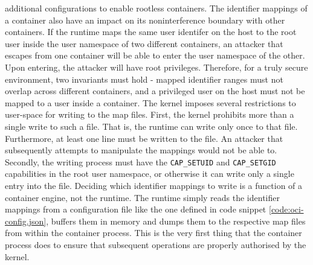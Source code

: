 additional configurations to enable rootless containers.
The identifier mappings of a container also have an impact on its noninterference boundary with 
other containers. If the runtime maps the same user identifer on the host to the root user inside the user namespace of two different containers, an 
attacker that escapes from one container will be able to enter the user namespace of the other. Upon entering,
the attacker will have root privileges. Therefore, for a truly secure environment, two invariants must hold - 
mapped identifier ranges must not overlap across different containers, and a privileged user on the host must 
not be mapped to a user inside a container. The kernel imposes several restrictions to user-space for 
writing to the map files. First, the kernel prohibits more than a single write to such a file. 
That is, the runtime can write only once to that file. Furthermore, at least one line must be 
written to the file. An attacker that subsequently attempts to manipulate the mappings would not 
be able to. Secondly, the writing process must have the \verb|CAP_SETUID| and 
\verb|CAP_SETGID| capabilities in the root user namespace, or otherwise it can 
write only a single entry into the file. Deciding which identifier mappings to write is a function 
of a container engine, not the runtime. The runtime simply reads the identifier mappings
from a configuration file like the one defined in code snippet \ref{code:oci-config.json}, buffers 
them in memory and dumps them to the respective map files from within the container process.
This is the very first thing that the container process does to ensure that subsequent operations
are properly authorised by the kernel. 

